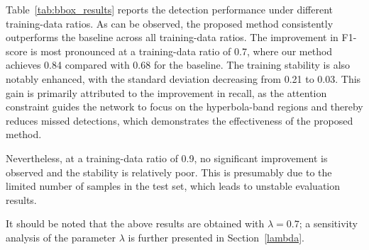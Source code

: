 \documentclass[lettersize,journal]{IEEEtran}
\begin{document}

Table~\ref{tab:bbox_results} reports the detection performance under different
training-data ratios. As can be observed, the proposed method consistently
outperforms the baseline across all training-data ratios. The improvement in
F1-score is most pronounced at a training-data ratio of 0.7, where our method
achieves 0.84 compared with 0.68 for the baseline. The training stability is
also notably enhanced, with the standard deviation decreasing from 0.21 to 0.03.
This gain is primarily attributed to the improvement in recall, as the attention
constraint guides the network to focus on the hyperbola-band regions and thereby
reduces missed detections, which demonstrates the effectiveness of the proposed
method.

Nevertheless, at a training-data ratio of 0.9, no significant improvement is
observed and the stability is relatively poor. This is presumably due to the
limited number of samples in the test set, which leads to unstable evaluation
results. 

It should be noted that the above results are obtained with $\lambda=0.7$; a
sensitivity analysis of the parameter $\lambda$ is further presented in
Section~\ref{lambda}.
\end{document}
